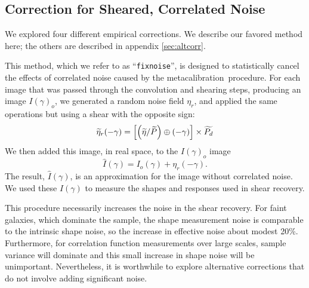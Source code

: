 \documentclass[iop]{emulateapj}
\newcommand{\mcal}{metacalibration}
\newcommand{\ntil}{\mbox{$\widetilde{\eta}$}}
\newcommand{\Ptil}{\mbox{$\widetilde{P}$}}
\newcommand{\Ptild}{\mbox{$\widetilde{P_d}$}}
\newcommand{\fixnoise}{\texttt{fixnoise}}
\begin{document}


\subsection{Correction for Sheared, Correlated Noise} \label{sec:fixnoise}


We explored four different empirical corrections.  We describe our favored
method here; the others are described in appendix \ref{sec:altcorr}.

This method, which we refer to as ``\fixnoise'', is designed to statistically
cancel the effects of correlated noise caused by the \mcal\ procedure.  For each
image that was passed through the convolution and shearing steps, producing
an image $I(\gamma)_o$, we generated a random noise field
$\eta_r$, and applied the same operations but using a shear with
the opposite sign:
\begin{equation}
    \widetilde{\eta}_r(-\gamma) = \left[ \left( \ntil/\Ptil \right) \oplus (-\gamma) \right] \times \Ptild  \nonumber \\
\end{equation}
We then added this image, in real space, to the $I(\gamma)_o$ image
\begin{equation}
    \hat{I}(\gamma) = I_o(\gamma) + \eta_r(-\gamma).
\end{equation}
The result, $\hat{I}(\gamma)$, is an approximation for the image
without correlated noise.
We used these $\hat{I}(\gamma)$ to measure the shapes and responses used in
shear recovery.  

This procedure necessarily increases the noise in the shear recovery.  For
faint galaxies, which dominate the sample, the shape measurement noise is
comparable to the intrinsic shape noise, so the increase in effective noise
about modest 20\%.  Furthermore, for correlation function measurements over
large scales, sample variance will dominate and this small increase in shape
noise will be unimportant.  Nevertheless, it is worthwhile to explore
alternative corrections that do not involve adding significant noise.
\end{document}
